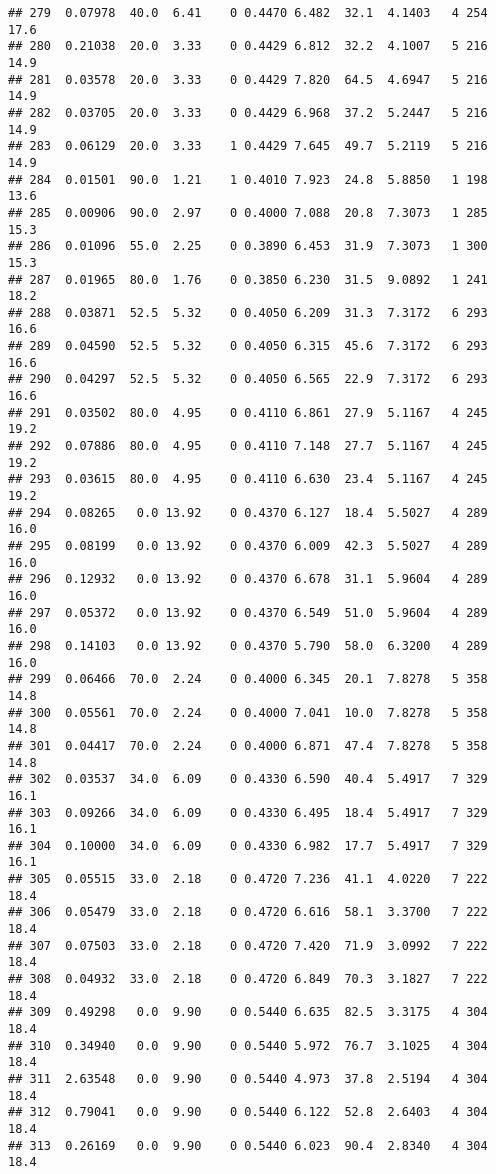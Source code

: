 \documentclass[]{article}
\begin{document}
\begin{verbatim}
## 279  0.07978  40.0  6.41    0 0.4470 6.482  32.1  4.1403   4 254    17.6
## 280  0.21038  20.0  3.33    0 0.4429 6.812  32.2  4.1007   5 216    14.9
## 281  0.03578  20.0  3.33    0 0.4429 7.820  64.5  4.6947   5 216    14.9
## 282  0.03705  20.0  3.33    0 0.4429 6.968  37.2  5.2447   5 216    14.9
## 283  0.06129  20.0  3.33    1 0.4429 7.645  49.7  5.2119   5 216    14.9
## 284  0.01501  90.0  1.21    1 0.4010 7.923  24.8  5.8850   1 198    13.6
## 285  0.00906  90.0  2.97    0 0.4000 7.088  20.8  7.3073   1 285    15.3
## 286  0.01096  55.0  2.25    0 0.3890 6.453  31.9  7.3073   1 300    15.3
## 287  0.01965  80.0  1.76    0 0.3850 6.230  31.5  9.0892   1 241    18.2
## 288  0.03871  52.5  5.32    0 0.4050 6.209  31.3  7.3172   6 293    16.6
## 289  0.04590  52.5  5.32    0 0.4050 6.315  45.6  7.3172   6 293    16.6
## 290  0.04297  52.5  5.32    0 0.4050 6.565  22.9  7.3172   6 293    16.6
## 291  0.03502  80.0  4.95    0 0.4110 6.861  27.9  5.1167   4 245    19.2
## 292  0.07886  80.0  4.95    0 0.4110 7.148  27.7  5.1167   4 245    19.2
## 293  0.03615  80.0  4.95    0 0.4110 6.630  23.4  5.1167   4 245    19.2
## 294  0.08265   0.0 13.92    0 0.4370 6.127  18.4  5.5027   4 289    16.0
## 295  0.08199   0.0 13.92    0 0.4370 6.009  42.3  5.5027   4 289    16.0
## 296  0.12932   0.0 13.92    0 0.4370 6.678  31.1  5.9604   4 289    16.0
## 297  0.05372   0.0 13.92    0 0.4370 6.549  51.0  5.9604   4 289    16.0
## 298  0.14103   0.0 13.92    0 0.4370 5.790  58.0  6.3200   4 289    16.0
## 299  0.06466  70.0  2.24    0 0.4000 6.345  20.1  7.8278   5 358    14.8
## 300  0.05561  70.0  2.24    0 0.4000 7.041  10.0  7.8278   5 358    14.8
## 301  0.04417  70.0  2.24    0 0.4000 6.871  47.4  7.8278   5 358    14.8
## 302  0.03537  34.0  6.09    0 0.4330 6.590  40.4  5.4917   7 329    16.1
## 303  0.09266  34.0  6.09    0 0.4330 6.495  18.4  5.4917   7 329    16.1
## 304  0.10000  34.0  6.09    0 0.4330 6.982  17.7  5.4917   7 329    16.1
## 305  0.05515  33.0  2.18    0 0.4720 7.236  41.1  4.0220   7 222    18.4
## 306  0.05479  33.0  2.18    0 0.4720 6.616  58.1  3.3700   7 222    18.4
## 307  0.07503  33.0  2.18    0 0.4720 7.420  71.9  3.0992   7 222    18.4
## 308  0.04932  33.0  2.18    0 0.4720 6.849  70.3  3.1827   7 222    18.4
## 309  0.49298   0.0  9.90    0 0.5440 6.635  82.5  3.3175   4 304    18.4
## 310  0.34940   0.0  9.90    0 0.5440 5.972  76.7  3.1025   4 304    18.4
## 311  2.63548   0.0  9.90    0 0.5440 4.973  37.8  2.5194   4 304    18.4
## 312  0.79041   0.0  9.90    0 0.5440 6.122  52.8  2.6403   4 304    18.4
## 313  0.26169   0.0  9.90    0 0.5440 6.023  90.4  2.8340   4 304    18.4

\end{verbatim}
\end{document}
